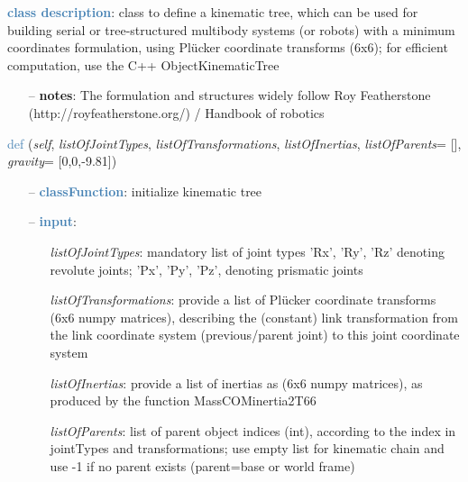 \begin{itemize}[leftmargin=1.4cm]
\begin{itemize}[leftmargin=1.4cm]
\begin{itemize}[leftmargin=0.5cm]
\begin{itemize}[leftmargin=1.4cm]
\begin{itemize}[leftmargin=1.4cm]
\begin{itemize}[leftmargin=0.5cm]
\begin{itemize}[leftmargin=1.4cm]
\begin{itemize}[leftmargin=0.5cm]
\begin{itemize}[leftmargin=1.4cm]
\begin{itemize}[leftmargin=1.4cm]
\begin{itemize}[leftmargin=1.4cm]
%
\noindent\textcolor{steelblue}{{\bf class description}}:  class to define a kinematic tree, which can be used for building serial or tree-structured multibody systems
         (or robots) with a minimum coordinates formulation, using Pl\"ucker coordinate transforms (6x6); for efficient computation, use the C++ ObjectKinematicTree
\setlength{\itemindent}{0.7cm}
\begin{itemize}[leftmargin=0.7cm]
\item[--]{\bf notes}: The formulation and structures widely follow Roy Featherstone (http://royfeatherstone.org/) / Handbook of robotics \cite{Siciliano2016}
\vspace{24pt}\end{itemize}
%
\begin{flushleft}
\noindent \textcolor{steelblue}{def {\bf {}}}\label{sec:kinematicTree:KinematicTree66:__init__}
({\it self}, {\it listOfJointTypes}, {\it listOfTransformations}, {\it listOfInertias}, {\it listOfParents}= [], {\it gravity}= [0,0,-9.81])
\end{flushleft}
\setlength{\itemindent}{0.7cm}
\begin{itemize}[leftmargin=0.7cm]
\item[--]\textcolor{steelblue}{\bf classFunction}: initialize kinematic tree
\item[--]\textcolor{steelblue}{\bf input}: \vspace{-6pt}
\begin{itemize}[leftmargin=1.2cm]
\setlength{\itemindent}{-0.7cm}
\item[]{\it listOfJointTypes}: mandatory list of joint types 'Rx', 'Ry', 'Rz' denoting revolute joints; 'Px', 'Py', 'Pz', denoting prismatic joints
\item[]{\it listOfTransformations}: provide a list of Pl\"ucker coordinate transforms (6x6 numpy matrices), describing the (constant) link transformation from the link coordinate system (previous/parent joint) to this joint coordinate system
\item[]{\it listOfInertias}: provide a list of inertias as (6x6 numpy matrices), as produced by the function MassCOMinertia2T66
\item[]{\it listOfParents}: list of parent object indices (int), according to the index in jointTypes and transformations; use empty list for kinematic chain and use -1 if no parent exists (parent=base or world frame)

\end{itemize}
\end{itemize}
\end{itemize}
\end{itemize}
\end{itemize}
\end{itemize}
\end{itemize}
\end{itemize}
\end{itemize}
\end{itemize}
\end{itemize}
\end{itemize}
\end{itemize}
